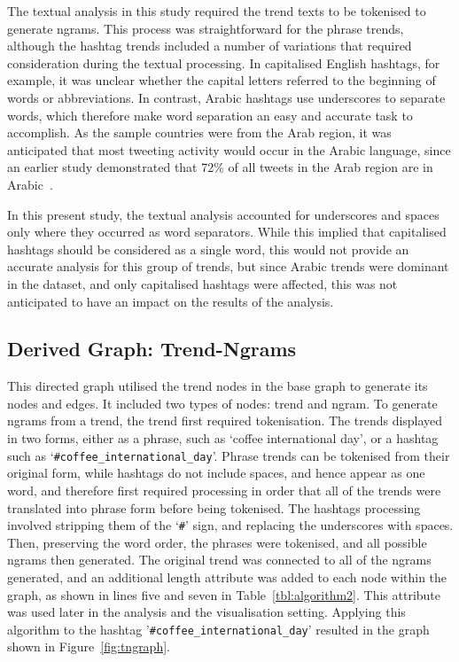 \documentclass{comjnl}
\begin{document}
The textual analysis in this study required the trend texts to be tokenised to generate ngrams. This process was straightforward for the phrase trends, although the hashtag trends included a number of variations that required consideration during the textual processing. In capitalised English hashtags, for example, it was unclear whether the capital letters referred to the beginning of words or abbreviations. In contrast, Arabic hashtags use underscores to separate words, which therefore make word separation an easy and accurate task to accomplish. As the sample countries were from the Arab region, it was anticipated that most tweeting activity would occur in the Arabic language, since an earlier study demonstrated that 72\% of all tweets in the Arab region are in Arabic~\cite{Salem2017}.

In this present study, the textual analysis accounted for underscores and spaces only where they occurred as word separators. While this implied that capitalised hashtags should be considered as a single word, this would not provide an accurate analysis for this group of trends, but since Arabic trends were dominant in the dataset, and only capitalised hashtags were affected, this was not anticipated to have an impact on the results of the analysis.


\subsection{Derived Graph: Trend-Ngrams}

This directed graph utilised the trend nodes in the base graph to generate its nodes and edges. It included two types of nodes: trend and ngram. To generate ngrams from a trend, the trend first required tokenisation. The trends displayed in two forms, either as a phrase, such as `coffee international day', or a hashtag such as `{\texttt{\#coffee\_international\_day}}'.  Phrase trends can be tokenised from their original form, while hashtags do not include spaces, and hence appear as one word, and therefore first required processing in order that all of the trends were translated into phrase form before being tokenised. The hashtags processing involved stripping them of the `{\texttt{\#}}' sign, and replacing the underscores with spaces. Then, preserving the word order, the phrases were tokenised, and all possible ngrams then generated.  The original trend was connected to all of the ngrams generated, and an additional length attribute was added to each node within the graph, as shown in lines five and seven in Table~\ref{tbl:algorithm2}.  This attribute was used later in the analysis and the visualisation setting. Applying this algorithm to the hashtag '{\texttt{\#coffee\_international\_day}}' resulted in the graph shown in Figure~\ref{fig:tngraph}.
\end{document}
